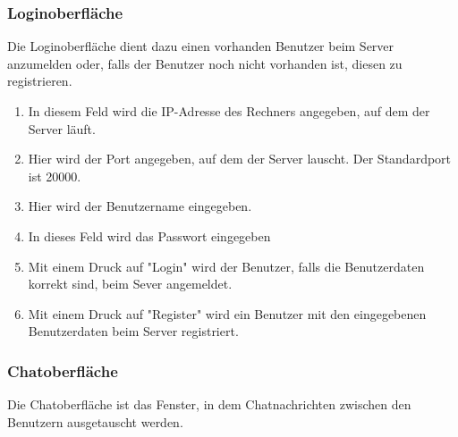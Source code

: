\documentclass[12pt,a4paper,bibliography=totocnumbered,listof=totocnumbered]{scrartcl}
\begin{document}
\subsubsection{Loginoberfläche}
Die Loginoberfläche dient dazu einen vorhanden Benutzer beim Server anzumelden oder, falls der Benutzer noch nicht vorhanden ist, diesen zu registrieren.

\vspace{1em}
\begin{minipage}{\linewidth}
	\centering
\end{minipage}
\vspace{0.5em}

\begin{enumerate}
	\item In diesem Feld wird die IP-Adresse des Rechners angegeben, auf dem der Server läuft.
	\item Hier wird der Port angegeben, auf dem der Server lauscht. Der Standardport ist 20000. 
	\item Hier wird der Benutzername eingegeben.
	\item In dieses Feld wird das Passwort eingegeben
	\item Mit einem Druck auf "Login" wird der Benutzer, falls die Benutzerdaten korrekt sind, beim Sever angemeldet.
	\item Mit einem Druck auf "Register" wird ein Benutzer mit den eingegebenen Benutzerdaten beim Server registriert.
\end{enumerate}
\subsubsection{Chatoberfläche}
Die Chatoberfläche ist das Fenster, in dem Chatnachrichten zwischen den Benutzern ausgetauscht werden.

\vspace{1em}
\begin{minipage}{\linewidth}
	\centering
\end{minipage}
\vspace{0.5em}
\end{document}

